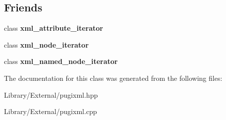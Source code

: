 \subsection*{Friends}
\begin{DoxyCompactItemize}
\item 
\hypertarget{classpugi_1_1xml__node_aeff34dec57ee910e3344631528969539}{}class {\bfseries xml\+\_\+attribute\+\_\+iterator}\label{classpugi_1_1xml__node_aeff34dec57ee910e3344631528969539}

\item 
\hypertarget{classpugi_1_1xml__node_aa25e28e29a8cec4daa60cdd2d5934757}{}class {\bfseries xml\+\_\+node\+\_\+iterator}\label{classpugi_1_1xml__node_aa25e28e29a8cec4daa60cdd2d5934757}

\item 
\hypertarget{classpugi_1_1xml__node_a1e60ab2fa6d6adb56f4b833761fc0b66}{}class {\bfseries xml\+\_\+named\+\_\+node\+\_\+iterator}\label{classpugi_1_1xml__node_a1e60ab2fa6d6adb56f4b833761fc0b66}

\end{DoxyCompactItemize}


The documentation for this class was generated from the following files\+:\begin{DoxyCompactItemize}
\item 
Library/\+External/pugixml.\+hpp\item 
Library/\+External/pugixml.\+cpp\end{DoxyCompactItemize}
